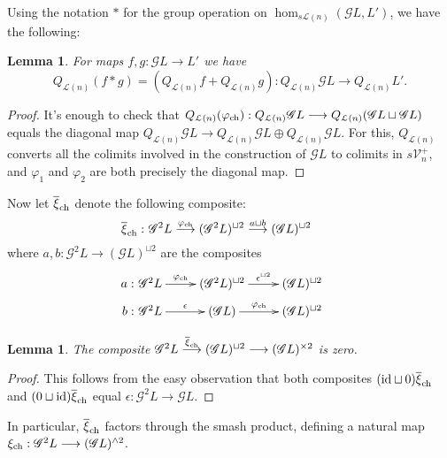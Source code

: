 \documentclass[11pt]{amsart}
\theoremstyle{plain}
\newtheorem{lem}[thm]{Lemma}
\theoremstyle{definition}
\let\phi\varphi
\renewcommand{\to}{\longrightarrow}
\newcommand{\scrQ}{\mathscr{Q}}
\newcommand{\scrR}{\mathscr{R}}
\newcommand{\scrT}{\mathscr{T}}
\newcommand{\scrY}{\mathscr{Y}}
\newcommand{\scrI}{\mathscr{I}}
\newcommand{\scrO}{\mathscr{O}}
\newcommand{\scrP}{\mathscr{P}}
\newcommand{\scrS}{\mathscr{S}}
\newcommand{\scrG}{\mathscr{G}}
\newcommand{\scrH}{\mathscr{H}}
\newcommand{\scrJ}{\mathscr{J}}
\newcommand{\scrK}{\mathscr{K}}
\newcommand{\scrL}{\mathscr{L}}
\newcommand{\scrZ}{\mathscr{Z}}
\newcommand{\scrN}{\mathscr{N}}
\newcommand{\scrM}{\mathscr{M}}
\newcommand{\calL}{\mathcal{L}}
\newcommand{\calV}{\mathcal{V}}
\theoremstyle{plain}
\newcommand{\vect}[2]{\calV^{#1}_{#2}}
\newcommand{\BSW}{{\scrG}}%
\begin{document}
\begin{comp func sseq old version}
\begin{shaded}
Using the notation $*$ for the group operation on $\hom_{s\calL(n)}(\BSW L,L')$, we have the following:
\begin{lem}
For maps $f,g:\BSW L\to L'$ we have 
\[Q_{\calL(n)}(f*g)=(Q_{\calL(n)}f+Q_{\calL(n)}g):Q_{\calL(n)}\BSW L\to Q_{\calL(n)}L'.\]
\end{lem}
\begin{proof}
It's enough to check that $Q_{\calL(n)}(\phi_\textup{ch}):Q_{\calL(n)}\BSW L\to Q_{\calL(n)}(\BSW L\sqcup \BSW L)$ equals the diagonal map $Q_{\calL(n)}\BSW L\to Q_{\calL(n)}\BSW L\oplus Q_{\calL(n)}\BSW L$. For this, $Q_{\calL(n)}$ converts all the colimits involved in the construction of $\BSW L$ to colimits in $s\vect{+}{n}$, and $\phi_1$ and $\phi_2$ are both precisely the diagonal map.
\end{proof}

Now let $\overline{\xi}_{\textup{ch}}$ denote the following composite:
\[\makebox[0mm][r]{$\overline{\xi}_{\textup{ch}}:\ $}\BSW^2L\overset{\phi_{\textup{ch}}}{\to}(\BSW^2L)^{\sqcup2}\overset{a\sqcup b}{\to}(\BSW L)^{\sqcup2}\]
where $a,b:\BSW^2L\to(\BSW L)^{\sqcup2}$ are the composites
\[\xymatrix@R=2mm{
\makebox[0mm][r]{$a:\ $}\BSW^2L\ar[r]^-{\phi_{\textup{ch}}}
&%
(\BSW^2L)^{\sqcup2}\ar[r]^-{\epsilon^{\sqcup2}}
&%
(\BSW L)^{\sqcup2}\\
\makebox[0mm][r]{$b:\ $}\BSW^2L\ar[r]^-{\epsilon}
&%
(\BSW L)\ar[r]^-{\phi_{\textup{ch}}}
&%
(\BSW L)^{\sqcup2}
}\]
\begin{lem}
The composite 
$\BSW^2L\overset{\overline{\xi}_{\textup{ch}}}{\to}(\BSW L)^{\sqcup2}\to(\BSW L)^{\times2}$ is zero.
\end{lem}
\begin{proof}
This follows from the easy observation that both composites $(\textup{id}\sqcup0)\overline{\xi}_{\textup{ch}}$ and $(0\sqcup\textup{id})\overline{\xi}_{\textup{ch}}$ equal $\epsilon:\BSW^2L\to \BSW L$.
\end{proof}
In particular, $\overline{\xi}_{\textup{ch}}$ factors through the smash product, defining a natural map $\xi_{\textup{ch}}:\BSW^2L\to (\BSW L)^{\wedge 2}$.


\end{shaded}
\end{comp func sseq old version}
\end{document}
